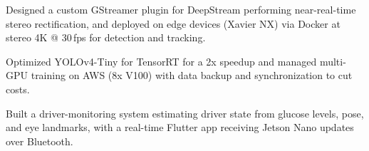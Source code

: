 \begin{points}
  \item Designed a custom GStreamer plugin for DeepStream performing near-real-time stereo rectification, and deployed on edge devices (Xavier NX) via Docker at stereo 4K @ 30\,fps for detection and tracking.
  \item Optimized YOLOv4-Tiny for TensorRT for a 2x speedup and managed multi-GPU training on AWS (8x V100) with data backup and synchronization to cut costs.
  \item Built a driver-monitoring system estimating driver state from glucose levels, pose, and eye landmarks, with a real-time Flutter app receiving Jetson Nano updates over Bluetooth.
\end{points}
